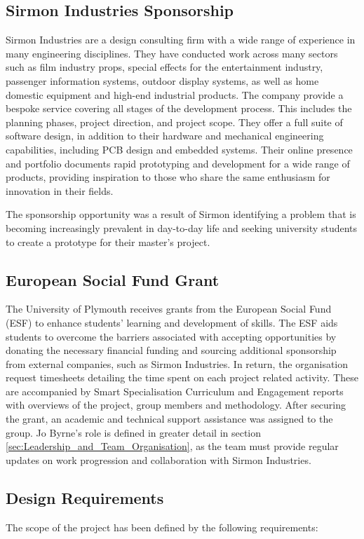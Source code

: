 \documentclass [12pt]{article}
\begin{document}
\subsection{Sirmon Industries Sponsorship}\label{sec:sponsorship}
Sirmon Industries are a design consulting firm with a wide range of experience in many engineering disciplines. They have conducted work across many sectors such as film industry props, special effects for the entertainment industry, passenger information systems, outdoor display systems, as well as home domestic equipment and high-end industrial products. The company provide a bespoke service covering all stages of the development process. This includes the planning phases, project direction, and project scope. They offer a full suite of software design, in addition to their hardware and mechanical engineering capabilities, including PCB design and embedded systems. Their online presence and portfolio documents rapid prototyping and development for a wide range of products, providing inspiration to those who share the same enthusiasm for innovation in their fields.

The sponsorship opportunity was a result of Sirmon identifying a problem that is becoming increasingly prevalent in day-to-day life and seeking university students to create a prototype for their master’s project.

\subsection{European Social Fund Grant}\label{sec:esf_grant}
The University of Plymouth receives grants from the European Social Fund (ESF) to enhance students’ learning and development of skills. The ESF aids students to overcome the barriers associated with accepting opportunities by donating the necessary financial funding and sourcing additional sponsorship from external companies, such as Sirmon Industries. In return, the organisation request timesheets detailing the time spent on each project related activity. These are accompanied by Smart Specialisation Curriculum and Engagement reports with overviews of the project, group members and methodology.
After securing the grant, an academic and technical support assistance was assigned to the group. Jo Byrne’s role is defined in greater detail in section \ref{sec:Leadership_and_Team_Organisation}, as the team must provide regular updates on work progression and collaboration with Sirmon Industries.


\subsection{Design Requirements}\label{sec:design_requirements}
The scope of the project has been defined by the following requirements: \\
\end{document}
